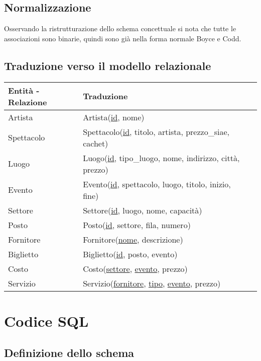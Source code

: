 \documentclass[a4paper,11pt]{article}
\begin{document}
\subsection{Normalizzazione}
Osservando la ristrutturazione dello schema concettuale si nota che tutte le
associazioni sono binarie, quindi sono già nella forma normale Boyce e Codd.

\subsection{Traduzione verso il modello relazionale}

\begin{tabularx}{\textwidth}{|X|>{\raggedright\arraybackslash}X|>{\raggedright\arraybackslash}X|}
\hline
  \textbf{Entità - Relazione} & \textbf{Traduzione}\\
\hline
  Artista & Artista(\underline{id}, nome) \\
\hline
  Spettacolo & Spettacolo(\underline{id}, titolo, artista, prezzo\_siae, cachet) \\
\hline
  Luogo & Luogo(\underline{id}, tipo\_luogo, nome, indirizzo, città, prezzo) \\
\hline
  Evento & Evento(\underline{id}, spettacolo, luogo, titolo, inizio, fine) \\
\hline
  Settore & Settore(\underline{id}, luogo, nome, capacità) \\
\hline
  Posto & Posto(\underline{id}, settore, fila, numero) \\
\hline
  Fornitore & Fornitore(\underline{nome}, descrizione) \\
\hline
  Biglietto & Biglietto(\underline{id}, posto, evento) \\
\hline
  Costo & Costo(\underline{settore}, \underline{evento}, prezzo) \\
\hline
  Servizio & Servizio(\underline{fornitore}, \underline{tipo}, \underline{evento}, prezzo) \\
\hline
\end{tabularx}

\section{Codice SQL}

\subsection{Definizione dello schema}

\end{document}
